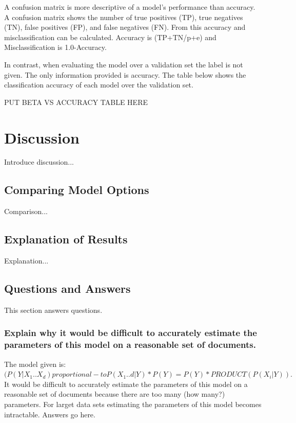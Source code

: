 \documentclass{IEEEtran}
\begin{document}
A confusion matrix is more descriptive of a model's performance than
accuracy. A confusion matrix shows the number of true positives (TP), true
negatives (TN), false positives (FP), and false negatives (FN). From this accuracy
and misclassification can be calculated. Accuracy is (TP+TN/p+e) and
Misclassification is 1.0-Accuracy.

In contrast, when evaluating the model over a validation set the label
is not given. The only information provided is accuracy. The table
below shows the classification accuracy of each model over the
validation set.

PUT BETA VS ACCURACY TABLE HERE

\section{Discussion}
Introduce discussion...

\subsection{Comparing Model Options}
Comparison...

\subsection{Explanation of Results}
Explanation...

\subsection{Questions and Answers}
This section answers questions.

\subsubsection{Explain why it would be difficult to accurately estimate the parameters of this model on a reasonable set of documents.}
The model given is: $(P(Y|X_1 .. X_d) proportional-to P(X_1..d|Y)*P(Y) = P(Y)*PRODUCT(P(X_i|Y)).$
It would be difficult to accurately estimate the parameters of this model on a reasonable set of documents because there are too many (how many?) parameters. For larget data sets estimating the parameters of this model becomes intractable.
Answers go here.

\end{document}
